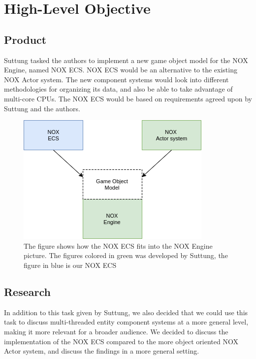 \section{High-Level Objective}
\subsection{Product}
Suttung tasked the authors to implement a new game object model for the NOX Engine, named NOX ECS.
NOX ECS would be an alternative to the existing NOX Actor system.
The new component systems would look into different methodologies for organizing its data, and also
be able to take advantage of multi-core CPUs.
The NOX ECS would be based on requirements agreed upon by Suttung and the authors.

\begin{figure}[H]
    \begin{center}
    \includegraphics[scale=0.45]{images/ecs_vs_actor_distinction.png}
    \caption[NOX ECS versus NOX Actor]{The figure shows how the NOX ECS fits into the NOX Engine picture. The figures colored in green was developed by Suttung, the figure in blue is our NOX ECS}
    \label{fig:ecs_vs_actor_distinction}
    \end{center}
\end{figure}

\subsection{Research}
In addition to this task given by Suttung, we also decided that we could use this task to discuss
multi-threaded entity component systems at a more general level, making it more relevant for a broader audience.
We decided to discuss the implementation of the NOX ECS compared to the more object oriented NOX Actor system,
and discuss the findings in a more general setting.

